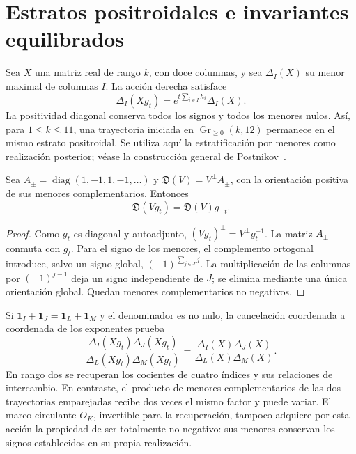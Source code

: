 \section{Estratos positroidales e invariantes equilibrados}

Sea \(X\) una matriz real de rango \(k\), con doce columnas, y sea \(\Delta_I(X)\) su menor maximal de columnas \(I\). La acción derecha satisface
\begin{equation}
 \Delta_I(Xg_t)=e^{t\sum_{i\in I}h_i}\Delta_I(X).
 \label{x_reciprocidad:rec:eq:plucker}
\end{equation}
La positividad diagonal conserva todos los signos y todos los menores nulos. Así, para \(1\le k\le11\), una trayectoria iniciada en \(\operatorname{Gr}_{\ge0}(k,12)\) permanece en el mismo estrato positroidal. Se utiliza aquí la estratificación por menores como realización posterior; véase la construcción general de Postnikov~\cite{x_reciprocidad:rec:postnikov}.

\begin{proposition}
Sea \(A_{\pm}=\operatorname{diag}(1,-1,1,-1,\ldots)\) y
\(\mathfrak D(V)=V^\perp A_{\pm}\), con la orientación positiva de sus menores complementarios. Entonces
\[
 \mathfrak D(Vg_t)=\mathfrak D(V)g_{-t}.
\]
\end{proposition}
\begin{proof}
Como \(g_t\) es diagonal y autoadjunto,
\((Vg_t)^\perp=V^\perp g_t^{-1}\). La matriz \(A_{\pm}\) conmuta con \(g_t\). Para el signo de los menores, el complemento ortogonal introduce, salvo un signo global, \((-1)^{\sum_{j\in J}j}\). La multiplicación de las columnas por \((-1)^{j-1}\) deja un signo independiente de \(J\); se elimina mediante una única orientación global. Quedan menores complementarios no negativos.
\end{proof}

Si \(\mathbf1_I+\mathbf1_J=\mathbf1_L+\mathbf1_M\) y el denominador es no nulo, la cancelación coordenada a coordenada de los exponentes prueba
\begin{equation}
 \frac{\Delta_I(Xg_t)\Delta_J(Xg_t)}{\Delta_L(Xg_t)\Delta_M(Xg_t)}
 =\frac{\Delta_I(X)\Delta_J(X)}{\Delta_L(X)\Delta_M(X)}.
 \label{x_reciprocidad:rec:eq:cocientes}
\end{equation}
En rango dos se recuperan los cocientes de cuatro índices y sus relaciones de intercambio. En contraste, el producto de menores complementarios de las dos trayectorias emparejadas recibe dos veces el mismo factor y puede variar. El marco circulante \(O_K\), invertible para la recuperación, tampoco adquiere por esta acción la propiedad de ser totalmente no negativo: sus menores conservan los signos establecidos en su propia realización.

